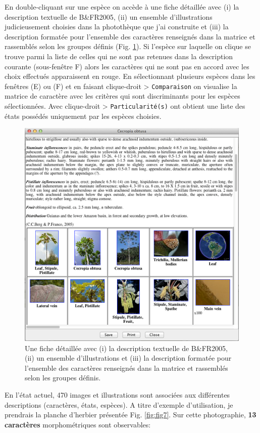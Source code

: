 \documentclass[a4paper]{article}
\theoremstyle{definition}
\theoremstyle{definition}
\theoremstyle{definition}
\theoremstyle{remark}
\begin{document}
En double-cliquant sur une espèce on accède à une fiche détaillée avec
(i) la description textuelle de B\&FR2005, (ii) un ensemble
d'illustrations judicieusement choisies dans la photothèque que j'ai
construite et (iii) la description formatée pour l'ensemble des
caractères renseignés dans la matrice et rassemblés selon les groupes
définis (Fig. \ref{fig:fig6}). Si l'espèce sur laquelle on clique se
trouve parmi la liste de celles qui ne sont pas retenues dans la
description courante (sous-fenêtre F) alors les caractères qui ne sont
pas en accord avec les choix effectués apparaissent en rouge. En
sélectionnant plusieurs espèces dans les fenêtres (E) ou (F) et en
faisant clique-droit \textgreater{} \texttt{Comparaison} on visualise la
matrice de caractère avec les critères qui sont discriminants pour les
espèces sélectionnées. Avec clique-droit \textgreater{}
\texttt{Particularité(s)} ont obtient une liste des états possédés
uniquement par les espèces choisies.






\begin{figure}[H]

{\centering \includegraphics[width=0.7\linewidth]{figure/fig6} 

}

\caption{Une fiche détaillée avec (i) la description textuelle de
B\&FR2005, (ii) un ensemble d'illustrations et (iii) la description
formatée pour l'ensemble des caractères renseignés dans la matrice et
rassemblés selon les groupes définis.}\label{fig:fig6}
\end{figure}

En l'état actuel, 470 images et illustrations sont associées aux
différentes descriptions (caractères, états, espèces). A titre d'exemple
d'utilisation, je prendrais la planche d'herbier présentée Fig.
\ref{fig:fig7}. Sur cette photographie, \textbf{13 caractères}
morphométriques sont observables:
\end{document}

